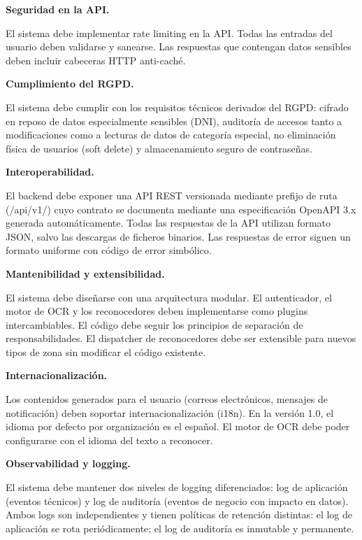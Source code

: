 \begin{nonfunctional}
  \item \textbf{Seguridad en la API.}

  El sistema debe implementar rate limiting en la API. Todas las entradas del usuario deben validarse y sanearse. Las respuestas que contengan datos sensibles deben incluir cabeceras HTTP anti-caché.

  \item \textbf{Cumplimiento del RGPD.}

  El sistema debe cumplir con los requisitos técnicos derivados del RGPD: cifrado en reposo de datos especialmente sensibles (DNI), auditoría de accesos tanto a modificaciones como a lecturas de datos de categoría especial, no eliminación física de usuarios (soft delete) y almacenamiento seguro de contraseñas.

  \item \textbf{Interoperabilidad.}

  El backend debe exponer una API REST versionada mediante prefijo de ruta (/api/v1/) cuyo contrato se documenta mediante una especificación OpenAPI 3.x generada automáticamente. Todas las respuestas de la API utilizan formato JSON, salvo las descargas de ficheros binarios. Las respuestas de error siguen un formato uniforme con código de error simbólico.

  \item \textbf{Mantenibilidad y extensibilidad.}

  El sistema debe diseñarse con una arquitectura modular. El autenticador, el motor de OCR y los reconocedores deben implementarse como plugins intercambiables. El código debe seguir los principios de separación de responsabilidades. El dispatcher de reconocedores debe ser extensible para nuevos tipos de zona sin modificar el código existente.

  \item \textbf{Internacionalización.}

  Los contenidos generados para el usuario (correos electrónicos, mensajes de notificación) deben soportar internacionalización (i18n). En la versión 1.0, el idioma por defecto por organización es el español. El motor de OCR debe poder configurarse con el idioma del texto a reconocer.

  \item \textbf{Observabilidad y logging.}

  El sistema debe mantener dos niveles de logging diferenciados: log de aplicación (eventos técnicos) y log de auditoría (eventos de negocio con impacto en datos). Ambos logs son independientes y tienen políticas de retención distintas: el log de aplicación se rota periódicamente; el log de auditoría es inmutable y permanente.


\end{nonfunctional}
